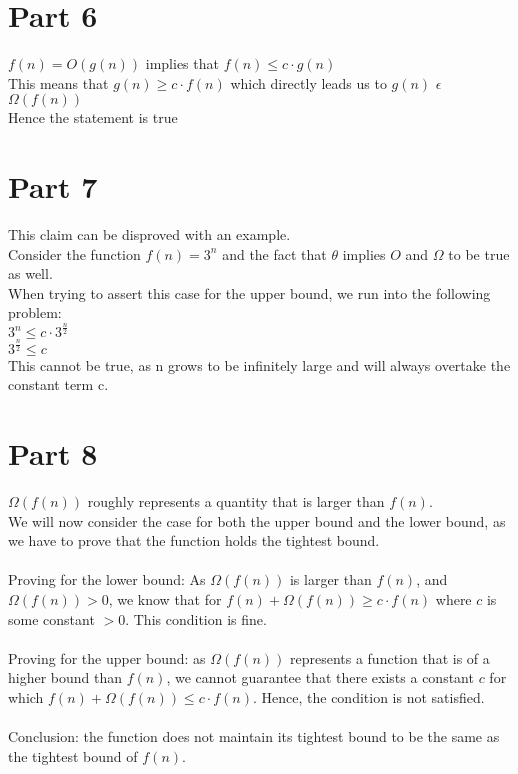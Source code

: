 \documentclass[]{article}
\begin{document}
\section{Part 6}

$ f(n) = O(g(n)) $ implies that $f(n) \leq c \cdot g(n) $ \\
This means that $g(n) \geq c \cdot f(n) $ which directly leads us to $ g(n) $ $ \epsilon $ $ \Omega (f(n)) $ \\
Hence the statement is true

\section{Part 7}
This claim can be disproved with an example. \\
Consider the function $f(n) = 3^n$ and the fact that $ \theta $ implies $O$ and $\Omega$ to be true as well. \\
When trying to assert this case for the upper bound, we run into the following problem: \\
$ 3^n \leq c \cdot 3^{\frac{n}{2}}$ \\
$ 3^{\frac{n}{2}} \leq c $ \\
This cannot be true, as n grows to be infinitely large and will always overtake the constant term c.

\section{Part 8}
$\Omega (f(n))$ roughly represents a quantity that is larger than $f(n)$. \\
We will now consider the case for both the upper bound and the lower bound, as we have to prove that the function holds the tightest bound. \\ \\
Proving for the lower bound: As $\Omega (f(n))$ is larger than $f(n)$, and $\Omega (f(n)) > 0$, we know that for $f(n) + \Omega (f(n)) \geq c \cdot f(n)$ where $c$ is some constant $> 0$. This condition is fine. \\ \\
Proving for the upper bound: as $\Omega (f(n))$ represents a function that is of a higher bound than $f(n)$, we cannot guarantee that there exists a constant $c$ for which $f(n) + \Omega (f(n)) \leq c \cdot f(n)$. Hence, the condition is not satisfied. \\ \\
Conclusion: the function does not maintain its tightest bound to be the same as the tightest bound of $f(n)$.
\end{document}
